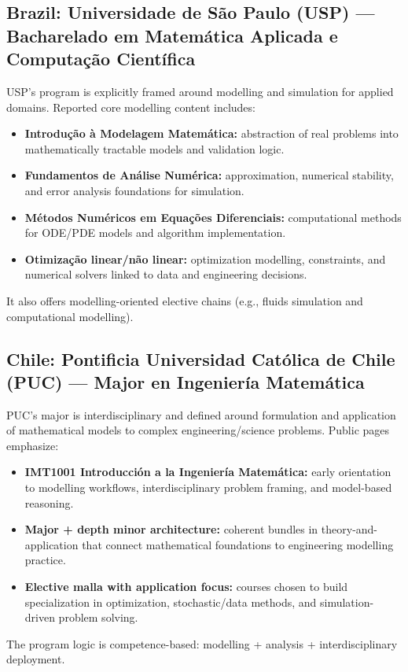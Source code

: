 ﻿\documentclass[11pt,a4paper]{article}
\begin{document}
\subsection*{Brazil: Universidade de S\~ao Paulo (USP) --- Bacharelado em Matem\'atica Aplicada e Computa\c{c}\~ao Cient\'ifica}
USP's program is explicitly framed around modelling and simulation for applied domains. Reported core modelling content includes:
\begin{itemize}[leftmargin=*]
  \item \textbf{Introdu\c{c}\~ao \`a Modelagem Matem\'atica:} abstraction of real problems into mathematically tractable models and validation logic.
  \item \textbf{Fundamentos de An\'alise Num\'erica:} approximation, numerical stability, and error analysis foundations for simulation.
  \item \textbf{M\'etodos Num\'ericos em Equa\c{c}\~oes Diferenciais:} computational methods for ODE/PDE models and algorithm implementation.
  \item \textbf{Otimiza\c{c}\~ao linear/n\~ao linear:} optimization modelling, constraints, and numerical solvers linked to data and engineering decisions.
\end{itemize}
It also offers modelling-oriented elective chains (e.g., fluids simulation and computational modelling).

\subsection*{Chile: Pontificia Universidad Cat\'olica de Chile (PUC) --- Major en Ingenier\'ia Matem\'atica}
PUC's major is interdisciplinary and defined around formulation and application of mathematical models to complex engineering/science problems. Public pages emphasize:
\begin{itemize}[leftmargin=*]
  \item \textbf{IMT1001 Introducci\'on a la Ingenier\'ia Matem\'atica:} early orientation to modelling workflows, interdisciplinary problem framing, and model-based reasoning.
  \item \textbf{Major + depth minor architecture:} coherent bundles in theory-and-application that connect mathematical foundations to engineering modelling practice.
  \item \textbf{Elective malla with application focus:} courses chosen to build specialization in optimization, stochastic/data methods, and simulation-driven problem solving.
\end{itemize}
The program logic is competence-based: modelling + analysis + interdisciplinary deployment.
\end{document}
